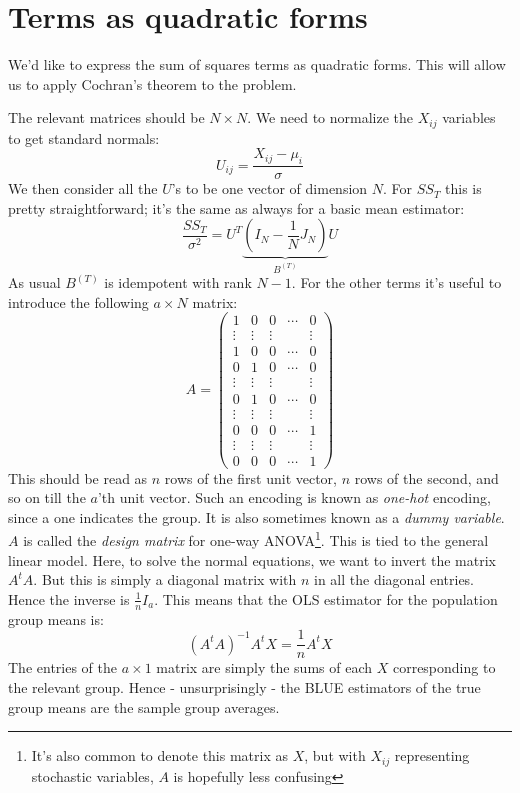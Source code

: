 \documentclass[12pt, a4paper]{article}
\begin{document}
\section{Terms as quadratic forms}
We'd like to express the sum of squares terms as quadratic forms. This will allow us to apply Cochran's theorem to the problem.\par
The relevant matrices should be $N\times N$. We need to normalize the $X_{ij}$ variables to get standard normals:
\begin{equation}
U_{ij}=\frac{X_{ij}-\mu_i}{\sigma}
\end{equation}
We then consider all the $U$'s to be one vector of dimension $N$. For $SS_T$ this is pretty straightforward; it's the same as always for a basic mean estimator:
\begin{equation}
\frac{SS_T}{\sigma^2}=U^T\underbrace{\left(I_N-\frac{1}{N}J_N\right)}_{B^{(T)}}U
\end{equation}
As usual $B^{(T)}$ is idempotent with rank $N-1$. For the other terms it's useful to introduce the following $a\times N$ matrix:
\begin{equation}
\label{designmatrix}
A=\begin{pmatrix}
1 & 0 & 0 & \cdots & 0 \\
\vdots & \vdots & \vdots & & \vdots \\
1 & 0 & 0 & \cdots & 0 \\
0 & 1 & 0 & \cdots & 0 \\
\vdots & \vdots & \vdots & & \vdots \\
0 & 1 & 0 & \cdots & 0 \\
\vdots & \vdots & \vdots & & \vdots \\
0 & 0 & 0 & \cdots & 1 \\
\vdots & \vdots & \vdots & & \vdots \\
0 & 0 & 0 & \cdots & 1
\end{pmatrix}
\end{equation}
This should be read as $n$ rows of the first unit vector, $n$ rows of the second, and so on till the $a$'th unit vector. Such an encoding is known as \textit{one-hot} encoding, since a one indicates the group. It is also sometimes known as a \textit{dummy variable}. $A$ is called the \textit{design matrix} for one-way ANOVA\footnote{It's also common to denote this matrix as $X$, but with $X_{ij}$ representing stochastic variables, $A$ is hopefully less confusing}. This is tied to the general linear model. Here, to solve the normal equations, we want to invert the matrix $A^t A$. But this is simply a diagonal matrix with $n$ in all the diagonal entries. Hence the inverse is $\frac{1}{n}I_a$. This means that the OLS estimator for the population group means is:
\begin{equation}
(A^t A)^{-1}A^t X=\frac{1}{n}A^t X
\end{equation}
The entries of the $a\times 1$ matrix are simply the sums of each $X$ corresponding to the relevant group. Hence - unsurprisingly - the BLUE estimators of the true group means are the sample group averages.
\end{document}
